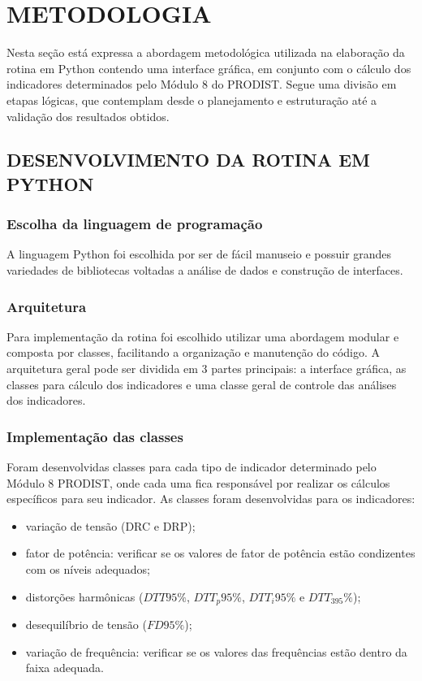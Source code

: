 \chapter{METODOLOGIA}

Nesta seção está expressa a abordagem metodológica utilizada na elaboração da rotina em Python contendo uma interface gráfica, em conjunto com o cálculo dos indicadores determinados pelo Módulo 8 do PRODIST. Segue uma divisão em etapas lógicas, que contemplam desde o planejamento e estruturação até a validação dos resultados obtidos.

\section{DESENVOLVIMENTO DA ROTINA EM PYTHON}

\subsection{Escolha da linguagem de programação}

A linguagem Python foi escolhida por ser de fácil manuseio e possuir grandes variedades de bibliotecas voltadas a análise de dados e construção de interfaces.

\subsection{Arquitetura}

Para implementação da rotina foi escolhido utilizar uma abordagem modular e composta por classes, facilitando a organização e manutenção do código. A arquitetura geral pode ser dividida em 3 partes principais: a interface gráfica, as classes para cálculo dos indicadores e uma classe geral de controle das análises dos indicadores.

\subsection{Implementação das classes}

Foram desenvolvidas classes para cada tipo de indicador determinado pelo Módulo 8 PRODIST, onde cada uma fica responsável por realizar os cálculos específicos para seu indicador. As classes foram desenvolvidas para os indicadores:

\begin{itemize}
  \item variação de tensão (DRC e DRP);
  \item fator de potência: verificar se os valores de fator de potência estão condizentes com os níveis adequados;
  \item distorções harmônicas ($DTT95\%$, $DTT_p95\%$, $DTT_i95\%$ e $DTT_395\%$);
  \item desequilíbrio de tensão ($FD95\%$);
  \item variação de frequência: verificar se os valores das frequências estão dentro da faixa adequada.
\end{itemize}

